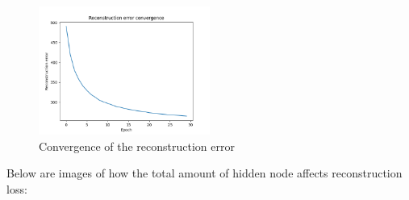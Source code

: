 \documentclass[a4paper]{article}
\begin{document}
\begin{figure}[ht]
    \centering
    \includegraphics[width=0.5\textwidth]{Labs/Lab 4/Steinar/reconstruction_convergence.png}
    \caption{Convergence of the reconstruction error}
    \label{fig:reconstruction-convergence}
\end{figure}
Below are images of how the total amount of hidden node affects reconstruction loss:
\end{document}
